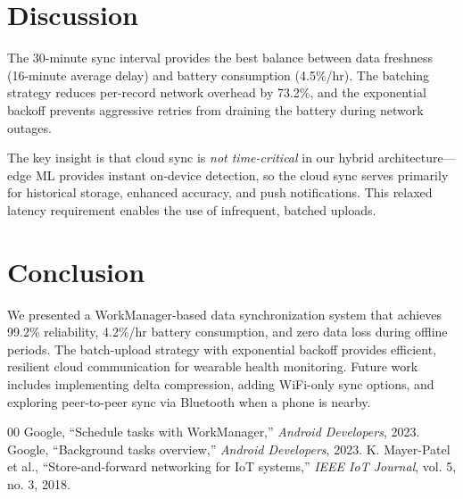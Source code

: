 \documentclass[conference]{IEEEtran}
\begin{document}
\section{Discussion}
The 30-minute sync interval provides the best balance between data freshness (16-minute average delay) and battery consumption (4.5\%/hr). The batching strategy reduces per-record network overhead by 73.2\%, and the exponential backoff prevents aggressive retries from draining the battery during network outages.

The key insight is that cloud sync is \textit{not time-critical} in our hybrid architecture---edge ML provides instant on-device detection, so the cloud sync serves primarily for historical storage, enhanced accuracy, and push notifications. This relaxed latency requirement enables the use of infrequent, batched uploads.

\section{Conclusion}
We presented a WorkManager-based data synchronization system that achieves 99.2\% reliability, 4.2\%/hr battery consumption, and zero data loss during offline periods. The batch-upload strategy with exponential backoff provides efficient, resilient cloud communication for wearable health monitoring. Future work includes implementing delta compression, adding WiFi-only sync options, and exploring peer-to-peer sync via Bluetooth when a phone is nearby.

\begin{thebibliography}{00}
 Google, ``Schedule tasks with WorkManager,'' \textit{Android Developers}, 2023.
 Google, ``Background tasks overview,'' \textit{Android Developers}, 2023.
 K. Mayer-Patel et al., ``Store-and-forward networking for IoT systems,'' \textit{IEEE IoT Journal}, vol. 5, no. 3, 2018.
\end{thebibliography}
\end{document}
